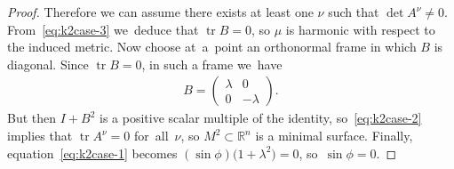 \documentclass[pdftex]{sigma}
\def\R{\mathbb{R}}
\def\tr{\operatorname{tr}}
\numberwithin{equation}{section}
\begin{document}
\begin{proof}
Therefore we can assume there exists at least one $\nu$ such that $\det A^{\nu} \neq 0$. From~\eqref{eq:k2case-3} we~deduce that $\tr B = 0$, so $\mu$ is harmonic with respect to the induced metric. Now choose at~a~point an orthonormal frame in which $B$ is diagonal. Since $\tr B = 0$, in such a frame we~have
\begin{gather*}
B = \begin{pmatrix} \lambda & 0 \\ 0 & - \lambda \end{pmatrix}.
\end{gather*}
But then $I + B^2$ is a positive scalar multiple of the identity, so~\eqref{eq:k2case-2} implies that $\tr A^{\nu} = 0$ for~all~$\nu$, so $M^2 \subset \R^n$ is a minimal surface. Finally, equation~\eqref{eq:k2case-1} becomes $(\sin \phi) \big(1 + \lambda^2\big) = 0$, so~$\sin \phi = 0$.
\end{proof}
\end{document}
